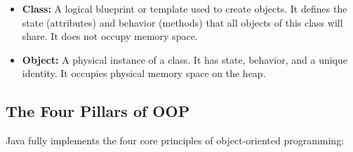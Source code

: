 \documentclass[12pt,a4paper]{article}
\begin{document}
\begin{tcolorbox}[defbox, title={\textbf{Class vs. Object}}]
\begin{itemize}[leftmargin=*, itemsep=3pt]
  \item \textbf{Class:} A logical blueprint or template used to create objects. It defines the state (attributes) and behavior (methods) that all objects of this class will share. It does not occupy memory space.
  \item \textbf{Object:} A physical instance of a class. It has state, behavior, and a unique identity. It occupies physical memory space on the heap.
\end{itemize}
\end{tcolorbox}

\subsection{The Four Pillars of OOP}
Java fully implements the four core principles of object-oriented programming:
\end{document}
